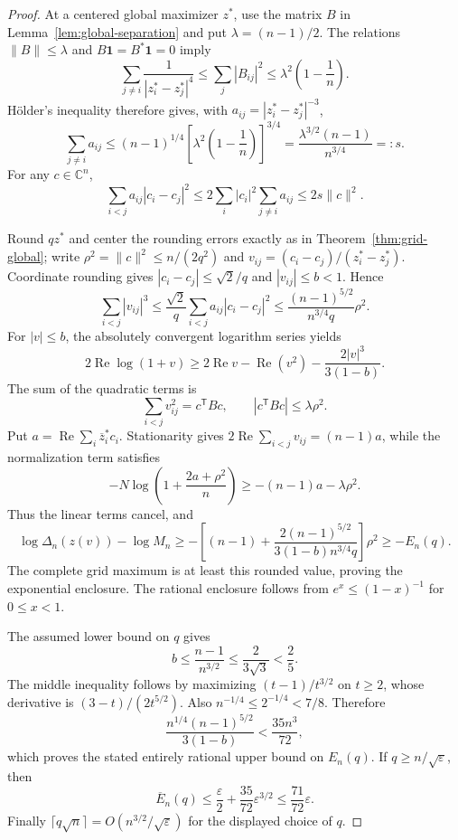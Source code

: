 \documentclass[11pt]{article}
\theoremstyle{remark}
\numberwithin{equation}{section}
\begin{document}
\begin{proof}
At a centered global maximizer $z^*$, use the matrix $B$ in
Lemma~\ref{lem:global-separation} and put $\lambda=(n-1)/2$.
The relations $\|B\|\le\lambda$ and $B\mathbf1=B^*\mathbf1=0$ imply
\[
 \sum_{j\ne i}\frac1{|z_i^*-z_j^*|^4}
 \le\sum_j|B_{ij}|^2
 \le\lambda^2\left(1-\frac1n\right).
\]
H\"older's inequality therefore gives, with $a_{ij}=|z_i^*-z_j^*|^{-3}$,
\[
 \sum_{j\ne i}a_{ij}
 \le(n-1)^{1/4}
      \left[\lambda^2\left(1-\frac1n\right)\right]^{3/4}
 =\frac{\lambda^{3/2}(n-1)}{n^{3/4}}=:s.
\]
For any $c\in\mathbb C^n$,
\[
 \sum_{i<j}a_{ij}|c_i-c_j|^2
 \le2\sum_i|c_i|^2\sum_{j\ne i}a_{ij}
 \le2s\|c\|^2.
\]

Round $qz^*$ and center the rounding errors exactly as in
Theorem~\ref{thm:grid-global}; write $\rho^2=\|c\|^2\le n/(2q^2)$
and $v_{ij}=(c_i-c_j)/(z_i^*-z_j^*)$.  Coordinate rounding gives
$|c_i-c_j|\le\sqrt2/q$ and $|v_{ij}|\le b<1$.  Hence
\[
 \sum_{i<j}|v_{ij}|^3
 \le\frac{\sqrt2}{q}\sum_{i<j}a_{ij}|c_i-c_j|^2
 \le\frac{(n-1)^{5/2}}{n^{3/4}q}\rho^2.
\]
For $|v|\le b$, the absolutely convergent logarithm series yields
\[
 2\operatorname{Re}\log(1+v)
 \ge2\operatorname{Re}v-\operatorname{Re}(v^2)
      -\frac{2|v|^3}{3(1-b)}.
\]
The sum of the quadratic terms is
\[
 \sum_{i<j}v_{ij}^2=c^{\mathsf T}Bc,
 \qquad|c^{\mathsf T}Bc|\le\lambda\rho^2.
\]
Put $a=\operatorname{Re}\sum_i\overline z_i^*c_i$.  Stationarity
gives $2\operatorname{Re}\sum_{i<j}v_{ij}=(n-1)a$, while the
normalization term satisfies
\[
 -N\log\left(1+\frac{2a+\rho^2}{n}\right)
 \ge-(n-1)a-\lambda\rho^2.
\]
Thus the linear terms cancel, and
\[
 \log\Delta_n(z(v))-\log M_n
 \ge-\left[(n-1)
     +\frac{2(n-1)^{5/2}}{3(1-b)n^{3/4}q}\right]\rho^2
 \ge-E_n(q).
\]
The complete grid maximum is at least this rounded value, proving
the exponential enclosure.  The rational enclosure follows from
$e^x\le(1-x)^{-1}$ for $0\le x<1$.

The assumed lower bound on $q$ gives
\[
 b\le\frac{n-1}{n^{3/2}}\le\frac2{3\sqrt3}<\frac25.
\]
The middle inequality follows by maximizing $(t-1)/t^{3/2}$ on
$t\ge2$, whose derivative is $(3-t)/(2t^{5/2})$.
Also $n^{-1/4}\le2^{-1/4}<7/8$.  Therefore
\[
 \frac{n^{1/4}(n-1)^{5/2}}{3(1-b)}
 <\frac{35n^3}{72},
\]
which proves the stated entirely rational upper bound on $E_n(q)$.
If $q\ge n/\sqrt\varepsilon$, then
\[
 \overline E_n(q)
 \le\frac\varepsilon2+\frac{35}{72}\varepsilon^{3/2}
 \le\frac{71}{72}\varepsilon.
\]
Finally $\lceil q\sqrt n\rceil=O(n^{3/2}/\sqrt\varepsilon)$ for
the displayed choice of $q$.
\end{proof}
\end{document}
